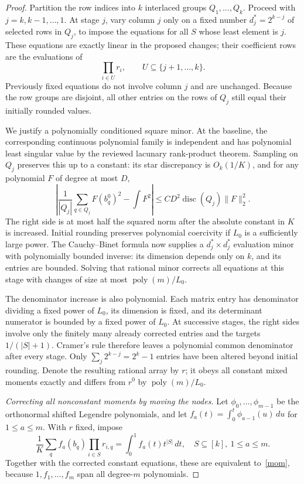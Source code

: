 \documentclass[11pt]{article}
\begin{document}
\begin{proof}
Partition the row indices into $k$ interlaced groups $Q_1,\ldots,Q_k$.
Proceed with $j=k,k-1,\ldots,1$. At stage $j$, vary column $j$ only
on a fixed number $d_j^*=2^{k-j}$ of selected rows in $Q_j$, to impose
the equations for all $S$ whose least element is $j$. These equations
are exactly linear in the proposed changes; their coefficient rows
are the evaluations of
\[
 \prod_{i\in U}r_i,\qquad U\subseteq\{j+1,\ldots,k\}.
\]
Previously fixed equations do not involve column $j$ and are unchanged.
Because the row groups are disjoint, all other entries on the rows
of $Q_j$ still equal their initially rounded values.

We justify a polynomially conditioned square minor. At the baseline,
the corresponding continuous polynomial family is independent and
has polynomial least singular value by the reviewed lacunary rank-product
theorem. Sampling on $Q_j$ preserves this up to a constant: its star
discrepancy is $O_k(1/K)$, and for any polynomial $F$ of degree at most
$D$,
\[
 \left|\frac1{|Q_j|}\sum_{q\in Q_j}F(b_q^0)^2-\int F^2\right|
 \le C D^2\operatorname{disc}(Q_j)\|F\|_2^2.
\]
The right side is at most half the squared norm after the absolute
constant in $K$ is increased. Initial rounding preserves polynomial
coercivity if $L_0$ is a sufficiently large power. The Cauchy--Binet
formula now supplies a $d_j^*\times d_j^*$ evaluation minor with
polynomially bounded inverse: its dimension depends only on $k$,
and its entries are bounded. Solving that rational minor corrects
all equations at this stage with changes of size at most
$\operatorname{poly}(m)/L_0$.

The denominator increase is also polynomial. Each matrix entry has
denominator dividing a fixed power of $L_0$, its dimension is fixed,
and its determinant numerator is bounded by a fixed power of $L_0$.
At successive stages, the right sides involve only the finitely many
already corrected entries and the targets $1/(|S|+1)$. Cramer's rule
therefore leaves a polynomial common denominator after every stage.
Only $\sum_j2^{k-j}=2^k-1$ entries have been altered beyond initial
rounding. Denote the resulting rational array by $r$; it obeys all
constant mixed moments exactly and differs from $r^0$ by
$\operatorname{poly}(m)/L_0$.

\medskip\noindent\emph{Correcting all nonconstant moments by moving the nodes.}
Let $\phi_0,\ldots,\phi_{m-1}$ be the orthonormal shifted Legendre
polynomials, and let $f_a(t)=\int_0^t\phi_{a-1}(u)\,du$ for
$1\le a\le m$. With $r$ fixed, impose
\begin{equation}\label{node}
 \frac1K\sum_q f_a(b_q)\prod_{i\in S}r_{i,q}
 =\int_0^1 f_a(t)t^{|S|}\,dt,
 \quad S\subseteq[k],\ 1\le a\le m.
\end{equation}
Together with the corrected constant equations, these are equivalent
to~\eqref{mom}, because $1,f_1,\ldots,f_m$ span all degree-$m$
polynomials.


\end{proof}
\end{document}
